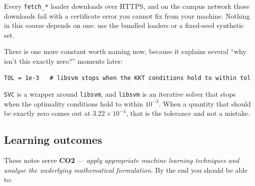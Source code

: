 \documentclass[11pt]{article}
\begin{document}
\begin{caution}
Every \texttt{fetch\_*} loader downloads over HTTPS, and on the campus network
those downloads fail with a certificate error you cannot fix from your machine.
Nothing in this course depends on one: use the bundled loaders or a
fixed-seed synthetic set.
\end{caution}

There is one more constant worth naming now, because it explains several
``why isn't this exactly zero?'' moments later:

\begin{lstlisting}
TOL = 1e-3   # libsvm stops when the KKT conditions hold to within tol
\end{lstlisting}

\texttt{SVC} is a wrapper around \texttt{libsvm}, and \texttt{libsvm} is an
iterative solver that stops when the optimality conditions hold to within
$10^{-3}$. When a quantity that should be exactly zero comes out at
$3.22\times10^{-4}$, that is the tolerance and not a mistake.

\subsection{Learning outcomes}

These notes serve \textbf{CO2} --- \emph{apply appropriate machine learning
techniques and analyse the underlying mathematical formulation}. By the end
you should be able to:
\end{document}
